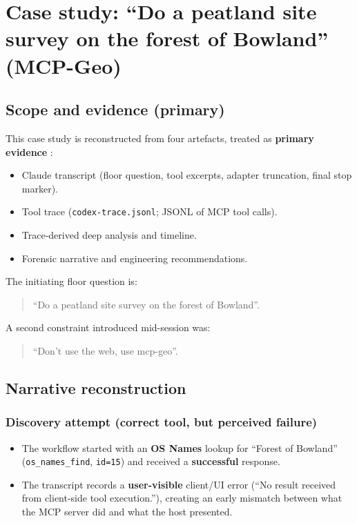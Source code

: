 \section{Case study: “Do a peatland site survey on the forest of Bowland” (MCP-Geo)}

\subsection{Scope and evidence (primary)}

This case study is reconstructed from four artefacts, treated as \textbf{primary evidence} \cite{artefact_claude_stopped_after_ngd_features_2026_02_18,artefact_codex_trace_jsonl_2026_02_18,artefact_floor_question_analysis_2026_02_19,artefact_forensic_study_mcp_geo_2026_02_19}:

\begin{itemize}[leftmargin=2em]
  \item Claude transcript (floor question, tool excerpts, adapter truncation, final stop marker). \cite{artefact_claude_stopped_after_ngd_features_2026_02_18}
  \item Tool trace (\texttt{codex-trace.jsonl}; JSONL of MCP tool calls). \cite{artefact_codex_trace_jsonl_2026_02_18}
  \item Trace-derived deep analysis and timeline. \cite{artefact_floor_question_analysis_2026_02_19}
  \item Forensic narrative and engineering recommendations. \cite{artefact_forensic_study_mcp_geo_2026_02_19}
\end{itemize}

The initiating floor question is:
\begin{quote}
“Do a peatland site survey on the forest of Bowland”. \cite{artefact_claude_stopped_after_ngd_features_2026_02_18}
\end{quote}

A second constraint introduced mid-session was:
\begin{quote}
“Don't use the web, use mcp-geo”. \cite{artefact_claude_stopped_after_ngd_features_2026_02_18}
\end{quote}

\subsection{Narrative reconstruction}

\subsubsection*{Discovery attempt (correct tool, but perceived failure)}
\begin{itemize}[leftmargin=2em]
  \item The workflow started with an \textbf{OS Names} lookup for “Forest of Bowland”
    (\texttt{os\_names\_find}, \texttt{id=15}) and received a \textbf{successful} response.
  \item The transcript records a \textbf{user-visible} client/UI error (“No result received from client-side tool execution.”),
    creating an early mismatch between what the MCP server did and what the host presented.
\end{itemize}

